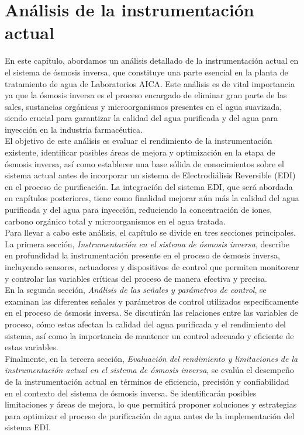 \chapter{Análisis de la instrumentación actual}

En este capítulo, abordamos un análisis detallado de la instrumentación actual en el sistema de ósmosis inversa, que constituye una parte esencial en la planta de tratamiento de agua de Laboratorios AICA. Este análisis es de vital importancia ya que la ósmosis inversa es el proceso encargado de eliminar gran parte de las sales, sustancias orgánicas y microorganismos presentes en el agua suavizada, siendo crucial para garantizar la calidad del agua purificada y del agua para inyección en la industria farmacéutica.\\

El objetivo de este análisis es evaluar el rendimiento de la instrumentación existente, identificar posibles áreas de mejora y optimización en la etapa de ósmosis inversa, así como establecer una base sólida de conocimientos sobre el sistema actual antes de incorporar un sistema de Electrodiálisis Reversible (EDI) en el proceso de purificación. La integración del sistema EDI, que será abordada en capítulos posteriores, tiene como finalidad mejorar aún más la calidad del agua purificada y del agua para inyección, reduciendo la concentración de iones, carbono orgánico total y microorganismos en el agua tratada.\\

Para llevar a cabo este análisis, el capítulo se divide en tres secciones principales. La primera sección, \textit{Instrumentación en el sistema de ósmosis inversa}, describe en profundidad la instrumentación presente en el proceso de ósmosis inversa, incluyendo sensores, actuadores y dispositivos de control que permiten monitorear y controlar las variables críticas del proceso de manera efectiva y precisa.\\

En la segunda sección, \textit{Análisis de las señales y parámetros de control}, se examinan las diferentes señales y parámetros de control utilizados específicamente en el proceso de ósmosis inversa. Se discutirán las relaciones entre las variables de proceso, cómo estas afectan la calidad del agua purificada y el rendimiento del sistema, así como la importancia de mantener un control adecuado y eficiente de estas variables.\\

Finalmente, en la tercera sección, \textit{Evaluación del rendimiento y limitaciones de la instrumentación actual en el sistema de ósmosis inversa}, se evalúa el desempeño de la instrumentación actual en términos de eficiencia, precisión y confiabilidad en el contexto del sistema de ósmosis inversa. Se identificarán posibles limitaciones y áreas de mejora, lo que permitirá proponer soluciones y estrategias para optimizar el proceso de purificación de agua antes de la implementación del sistema EDI.\\ 


